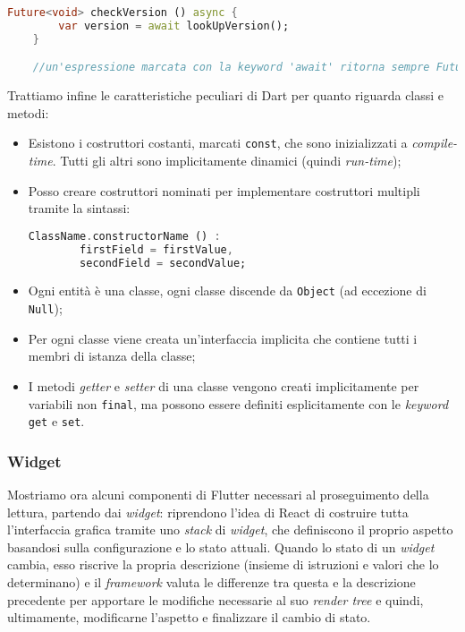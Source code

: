 \begin{lstlisting}[language=dart, firstnumber=1,caption={Dart programmazione asincrona}]
    Future<void> checkVersion () async {
        var version = await lookUpVersion();
    }

    //un'espressione marcata con la keyword 'await' ritorna sempre Future<T>
\end{lstlisting}

Trattiamo infine le caratteristiche peculiari di Dart per quanto riguarda classi e metodi:

\begin{itemize}
    \item Esistono i costruttori costanti, marcati \verb+const+, che sono inizializzati a \textit{compile-time}. Tutti gli altri sono implicitamente dinamici (quindi \textit{run-time});
    \item Posso creare costruttori nominati per implementare costruttori multipli tramite la sintassi:
\begin{lstlisting}[language=dart]
    ClassName.constructorName () :
        firstField = firstValue,
        secondField = secondValue;
\end{lstlisting}
    \item Ogni entità è una classe, ogni classe discende da \verb+Object+ (ad eccezione di \verb+Null+);
    \item Per ogni classe viene creata un'interfaccia implicita che contiene tutti i membri di istanza della classe;
    \item I metodi \textit{getter} e \textit{setter} di una classe vengono creati implicitamente per variabili non \verb+final+, ma possono essere definiti esplicitamente con le \textit{keyword} \verb+get+ e \verb+set+.
\end{itemize}

\subsubsection{Widget}
Mostriamo ora alcuni componenti di Flutter necessari al proseguimento della lettura, partendo dai \textit{widget}: riprendono l'idea di React di costruire tutta l'interfaccia grafica tramite uno \textit{stack} di \textit{widget}, che definiscono il proprio aspetto basandosi sulla configurazione e lo stato attuali. Quando lo stato di un \textit{widget} cambia, esso riscrive la propria descrizione (insieme di istruzioni e valori che lo determinano) e il \textit{framework} valuta le differenze tra questa e la descrizione precedente per apportare le modifiche necessarie al suo \textit{render tree} e quindi, ultimamente, modificarne l'aspetto e finalizzare il cambio di stato.

